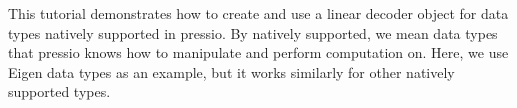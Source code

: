 

\begin{DoxyParagraph}{}
This tutorial demonstrates how to create and use a linear decoder object for data types natively supported in pressio. By natively supported, we mean data types that pressio knows how to manipulate and perform computation on. Here, we use Eigen data types as an example, but it works similarly for other natively supported types.
\end{DoxyParagraph}

\begin{DoxyCode}{0}

\end{DoxyCode}
 